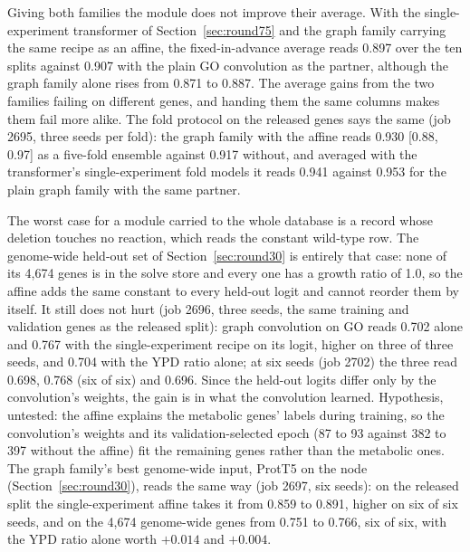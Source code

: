 Giving both families the module does not improve their average. With the
single-experiment transformer of Section~\ref{sec:round75} and the graph family carrying
the same recipe as an affine, the fixed-in-advance average reads 0.897 over the ten
splits against 0.907 with the plain GO convolution as the partner, although the graph
family alone rises from 0.871 to 0.887. The average gains from the two families failing
on different genes, and handing them the same columns makes them fail more alike. The
fold protocol on the released genes says the same (job 2695, three seeds per fold): the
graph family with the affine reads 0.930 [0.88, 0.97] as a five-fold ensemble against
0.917 without, and averaged with the transformer's single-experiment fold models it
reads 0.941 against 0.953 for the plain graph family with the same partner.

The worst case for a module carried to the whole database is a record whose deletion
touches no reaction, which reads the constant wild-type row. The genome-wide held-out set
of Section~\ref{sec:round30} is entirely that case: none of its 4,674 genes is in the
solve store and every one has a growth ratio of 1.0, so the affine adds the same constant
to every held-out logit and cannot reorder them by itself. It still does not hurt (job
2696, three seeds, the same training and validation genes as the released split): graph
convolution on GO reads 0.702 alone and 0.767 with the single-experiment recipe on its
logit, higher on three of three seeds, and 0.704 with the YPD ratio alone; at six seeds
(job 2702) the three read 0.698, 0.768 (six of six) and 0.696. Since the
held-out logits differ only by the convolution's weights, the gain is in what the
convolution learned. Hypothesis, untested: the affine explains the metabolic genes'
labels during training, so the convolution's weights and its validation-selected epoch
(87 to 93 against 382 to 397 without the affine) fit the remaining genes rather than
the metabolic ones. The graph family's best genome-wide input, ProtT5 on the node
(Section~\ref{sec:round30}), reads the same way (job 2697, six seeds): on the released
split the single-experiment affine takes it from 0.859 to 0.891, higher on six of six
seeds, and on the 4,674 genome-wide genes from 0.751 to 0.766, six of six, with the YPD
ratio alone worth $+0.014$ and $+0.004$.



